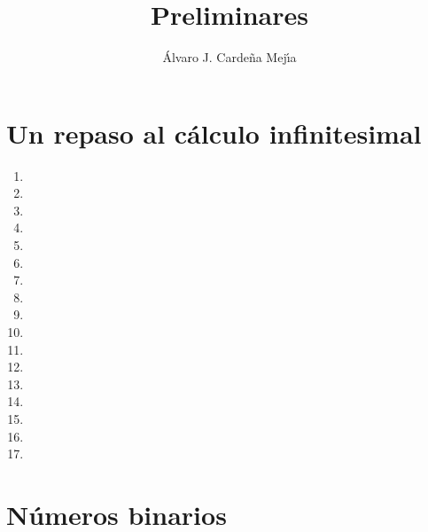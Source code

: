 \documentclass[a4paper,11pt]{article}
\title{Preliminares}
\author{\'Alvaro J. Carde\~na Mej\'{\i}a}
\theoremstyle{teoremas}
\theoremstyle{ejemplos}
\theoremstyle{definiciones}
\theoremstyle{lemas}
\begin{document}
\maketitle

\section{Un repaso al c\'alculo infinitesimal}

\begin{enumerate}
 \item  %
 \item 
 \item 
 \item 
 \item 
 \item 
 \item 
 \item 
 \item 
 \newpage
 \item 
 \item 
 \item 
 \item 
 \newpage
 \item 
 \item 
 \item 
 \item 
\end{enumerate}

\newpage

\section{N\'umeros binarios}
\end{document}
